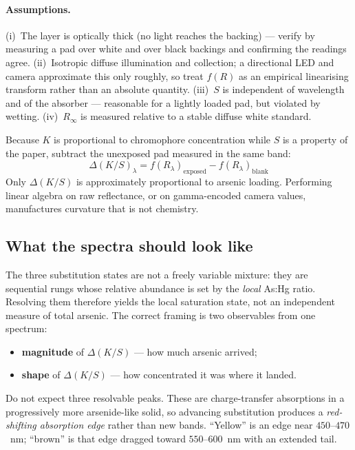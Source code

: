 \documentclass[11pt,a4paper]{article}
\begin{document}
\paragraph{Assumptions.}
(i)~The layer is optically thick (no light reaches the backing) --- verify
by measuring a pad over white and over black backings and confirming the
readings agree.
(ii)~Isotropic diffuse illumination and collection; a directional LED and
camera approximate this only roughly, so treat $f(R)$ as an empirical
linearising transform rather than an absolute quantity.
(iii)~$S$ is independent of wavelength and of the absorber --- reasonable
for a lightly loaded pad, but violated by wetting.
(iv)~$R_\infty$ is measured relative to a stable diffuse white standard.

Because $K$ is proportional to chromophore concentration while $S$ is a
property of the paper, subtract the unexposed pad measured in the same band:
\begin{equation}
  \Delta(K/S)_\lambda = f(R_\lambda)_{\text{exposed}}
  - f(R_\lambda)_{\text{blank}}
  \label{eq:dks}
\end{equation}
Only $\Delta(K/S)$ is approximately proportional to arsenic loading.
Performing linear algebra on raw reflectance, or on gamma-encoded camera
values, manufactures curvature that is not chemistry.

\subsection{What the spectra should look like}

The three substitution states are not a freely variable mixture: they are
sequential rungs whose relative abundance is set by the \emph{local}
As:Hg ratio. Resolving them therefore yields the local saturation state, not
an independent measure of total arsenic. The correct framing is two
observables from one spectrum:
\begin{itemize}[nosep]
  \item \textbf{magnitude} of $\Delta(K/S)$ --- how much arsenic arrived;
  \item \textbf{shape} of $\Delta(K/S)$ --- how concentrated it was where it
        landed.
\end{itemize}

Do not expect three resolvable peaks. These are charge-transfer absorptions
in a progressively more arsenide-like solid, so advancing substitution
produces a \emph{red-shifting absorption edge} rather than new bands.
``Yellow'' is an edge near $450$--$470$~nm; ``brown'' is that edge dragged
toward $550$--$600$~nm with an extended tail.
\end{document}
